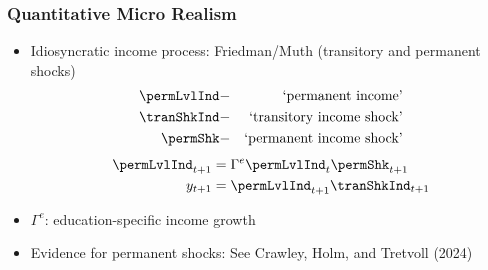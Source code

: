 \documentclass[pdflatex,aspectratio=169]{beamer}
\providecommand{\PermGroFac}{\Gamma}
\begin{document}
\begin{frame}
  \frametitle{Quantitative Micro Realism}
  \begin{itemize}
    \itemsep = \bigskipamount
    \item
          Idiosyncratic income process: Friedman/Muth (transitory and permanent shocks)
          \providecommand{\permLvl}{}\renewcommand{\permLvl}{\permLvlInd}
          \begin{eqnarray*}
            \permLvlInd & - & \text{`permanent income'} \\
            \tranShkInd & - & \text{`transitory income shock'}  \\
            \permShk & - & \text{`permanent income shock'}
          \end{eqnarray*}
          \begin{equation*}
            \begin{gathered}
              \begin{aligned}
                \permLvlInd_{t+1} & = \PermGroFac^{e} \permLvlInd_{t} \permShk_{t+1} \\
                y_{t+1}           & = \permLvlInd_{t+1}\tranShkInd_{t+1}             \\
              \end{aligned}
            \end{gathered}
          \end{equation*}

    \item
          $\PermGroFac^{e}$: education-specific income growth
    \item
          Evidence for permanent shocks: See Crawley, Holm, and Tretvoll (2024)
  \end{itemize}
\end{frame}

%
\end{document}
